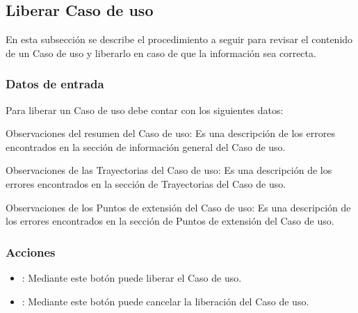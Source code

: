 \subsection{Liberar Caso de uso}

En esta subsección se describe el procedimiento a seguir para revisar el contenido de un Caso de uso y liberarlo en caso de que la información sea correcta.


\subsubsection{Datos de entrada}
\begin{description}
	\item Para liberar un Caso de uso debe contar con los siguientes datos: \hspace{10pt}
	\begin{description}
	    \item Observaciones del resumen del Caso de uso: Es una descripción de los errores encontrados en la sección de información general del Caso de uso.
	    \item Observaciones de las Trayectorias del Caso de uso: Es una descripción de los errores encontrados en la sección de Trayectorias del Caso de uso.
	    \item Observaciones de los Puntos de extensión del Caso de uso: Es una descripción de los errores encontrados en la sección de Puntos de extensión del Caso de uso.
	 \end{description}
\end{description}

\subsubsection{Acciones}
\begin{itemize}
  \item {}: Mediante este botón puede liberar el Caso de uso.
  \item {}: Mediante este botón puede cancelar la liberación del Caso de uso.
\end{itemize}


